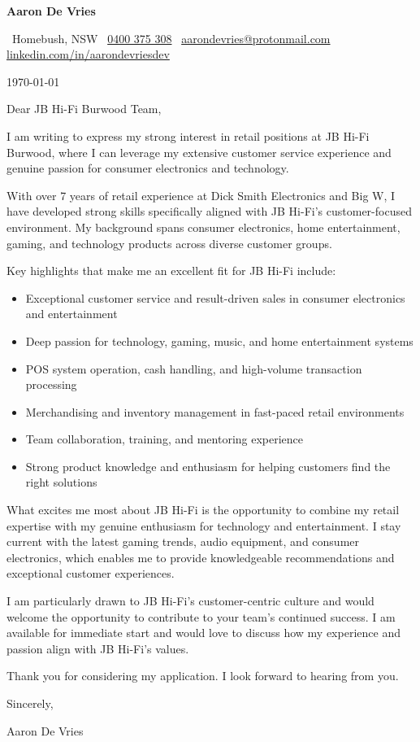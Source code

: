 \documentclass[a4paper,10pt]{article}
\makeatletter
\providecommand{\ContactBlock}{}
\renewcommand{\ContactBlock}{%
  {\Large \textbf{Aaron De Vries}}\par
  {\color{MidBlue}\small
  \faIcon{map-marker-alt}\, Homebush, NSW \quad\textbar\quad
  \faIcon{phone}\, \href{tel:+61400375308}{0400 375 308} \quad\textbar\quad
  \faIcon{envelope}\, \href{mailto:aarondevries@protonmail.com}{aarondevries@protonmail.com} \quad\textbar\quad
  \faIcon[brands]{linkedin}\, \href{https://linkedin.com/in/aarondevriesdev}{linkedin.com/in/aarondevriesdev}%
  }\par
}
\makeatother
\begin{document}
\ContactBlock

\vspace{1em}

\today

\vspace{1em}

Dear JB Hi-Fi Burwood Team,

I am writing to express my strong interest in retail positions at JB Hi-Fi Burwood, where I can leverage my extensive customer service experience and genuine passion for consumer electronics and technology.

With over 7 years of retail experience at Dick Smith Electronics and Big W, I have developed strong skills specifically aligned with JB Hi-Fi's customer-focused environment. My background spans consumer electronics, home entertainment, gaming, and technology products across diverse customer groups.

Key highlights that make me an excellent fit for JB Hi-Fi include:
\begin{itemize}
\item Exceptional customer service and result-driven sales in consumer electronics and entertainment
\item Deep passion for technology, gaming, music, and home entertainment systems
\item POS system operation, cash handling, and high-volume transaction processing
\item Merchandising and inventory management in fast-paced retail environments
\item Team collaboration, training, and mentoring experience
\item Strong product knowledge and enthusiasm for helping customers find the right solutions
\end{itemize}

What excites me most about JB Hi-Fi is the opportunity to combine my retail expertise with my genuine enthusiasm for technology and entertainment. I stay current with the latest gaming trends, audio equipment, and consumer electronics, which enables me to provide knowledgeable recommendations and exceptional customer experiences.

I am particularly drawn to JB Hi-Fi's customer-centric culture and would welcome the opportunity to contribute to your team's continued success. I am available for immediate start and would love to discuss how my experience and passion align with JB Hi-Fi's values.

Thank you for considering my application. I look forward to hearing from you.

Sincerely,

Aaron De Vries
\end{document}
